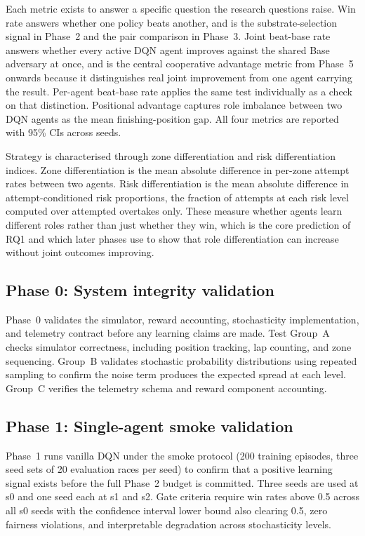 Each metric exists to answer a specific question the research questions raise. Win rate answers whether one policy beats another, and is the substrate-selection signal in Phase~2 and the pair comparison in Phase~3. Joint beat-base rate answers whether every active DQN agent improves against the shared Base adversary at once, and is the central cooperative advantage metric from Phase~5 onwards because it distinguishes real joint improvement from one agent carrying the result. Per-agent beat-base rate applies the same test individually as a check on that distinction. Positional advantage captures role imbalance between two DQN agents as the mean finishing-position gap. All four metrics are reported with 95\% CIs across seeds.

Strategy is characterised through zone differentiation and risk differentiation indices. Zone differentiation is the mean absolute difference in per-zone attempt rates between two agents. Risk differentiation is the mean absolute difference in attempt-conditioned risk proportions, the fraction of attempts at each risk level computed over attempted overtakes only. These measure whether agents learn different roles rather than just whether they win, which is the core prediction of RQ1 and which later phases use to show that role differentiation can increase without joint outcomes improving.

\subsection{Phase 0: System integrity validation}
\label{sec:phase0-design}

Phase~0 validates the simulator, reward accounting, stochasticity implementation, and telemetry contract before any learning claims are made. Test Group~A checks simulator correctness, including position tracking, lap counting, and zone sequencing. Group~B validates stochastic probability distributions using repeated sampling to confirm the noise term produces the expected spread at each level. Group~C verifies the telemetry schema and reward component accounting.

\subsection{Phase 1: Single-agent smoke validation}
\label{sec:phase1-design}

Phase~1 runs vanilla DQN under the smoke protocol (200 training episodes, three seed sets of 20 evaluation races per seed) to confirm that a positive learning signal exists before the full Phase~2 budget is committed. Three seeds are used at s0 and one seed each at s1 and s2. Gate criteria require win rates above 0.5 across all s0 seeds with the confidence interval lower bound also clearing 0.5, zero fairness violations, and interpretable degradation across stochasticity levels.

